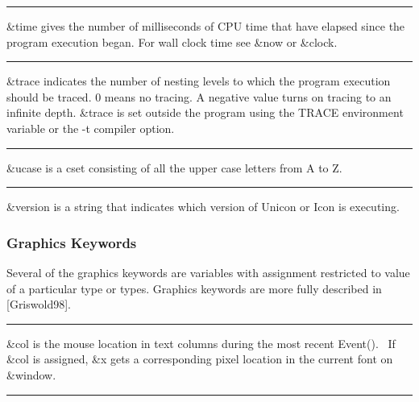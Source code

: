 \bigskip\hrule\vspace{0.1cm}

\noindent
{}\textsf{\&}\textsf{time}
gives the number of milliseconds of CPU time that have elapsed since
the program execution began. For wall clock time see \textsf{\&now} or
\textsf{\&clock}.

\bigskip\hrule\vspace{0.1cm}

\noindent
\textsf{\&trace} indicates the number of nesting levels to which the
program execution should be traced. 0 means no tracing.
A negative value turns on tracing to an infinite depth.
\textsf{\&trace} is set outside the program using the \textsf{TRACE}
environment variable or the
\textsf{{}-t} compiler option.

\bigskip\hrule\vspace{0.1cm}

\noindent
{}\textsf{\&ucase} is a cset consisting of all the upper
case letters from A to Z.

\bigskip\hrule\vspace{0.1cm}

\noindent
{}\textsf{\&version} is a string that indicates which
version of Unicon or Icon is executing.

\subsubsection{Graphics Keywords}

Several of the graphics keywords are variables with assignment
restricted to value of a particular type or types. Graphics keywords
are more fully described in [Griswold98].

\bigskip\hrule\vspace{0.1cm}

\noindent
\textsf{\&col} is the mouse location in text columns during the most
recent \textsf{Event()}. \ If \textsf{\&col} is assigned, \textsf{\&x}
gets a corresponding pixel location in the current font on
\textsf{\&window}.

\bigskip\hrule\vspace{0.1cm}

